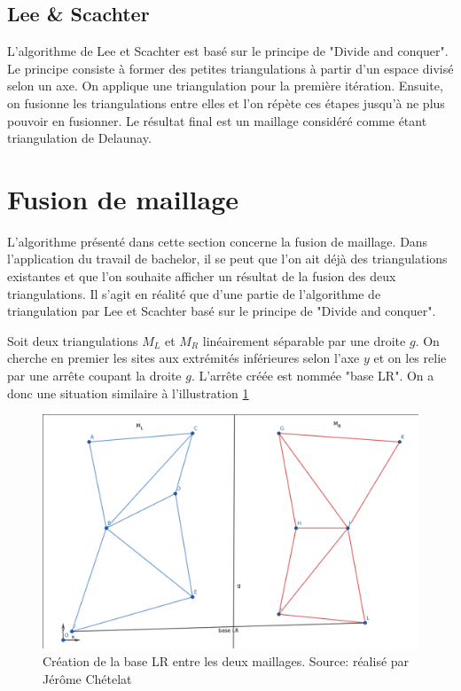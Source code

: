 \subsection{Lee \& Scachter}
L'algorithme de Lee et Scachter est basé sur le principe de "Divide and conquer". Le principe consiste à former des petites triangulations à partir d'un espace divisé selon un axe. On applique une triangulation pour la première itération. Ensuite, on fusionne les triangulations entre elles et l'on répète ces étapes jusqu'à ne plus pouvoir en fusionner. Le résultat final est un maillage considéré comme étant triangulation de Delaunay. 

\section{Fusion de maillage}

L'algorithme présenté dans cette section concerne la fusion de maillage. Dans l'application du travail de bachelor, il se peut que l'on ait déjà des triangulations existantes et que l'on souhaite afficher un résultat de la fusion des deux triangulations. Il s'agit en réalité que d'une partie de l'algorithme de triangulation par Lee et Scachter basé sur le principe de "Divide and conquer".



Soit deux triangulations $M_L$ et $M_R$ linéairement séparable par une droite $g$.
On cherche en premier les sites aux extrémités inférieures selon l'axe $y$ et on les relie par une arrête coupant la droite $g$.
L'arrête créée est nommée "base LR". On a donc une situation similaire à l'illustration \ref{fig:base_lr}

\begin{figure}[!htb]
    \centering
    \includegraphics[width=0.8\linewidth]{figures/base_lr.png}
    \caption{Création de la base LR entre les deux maillages. Source: réalisé par Jérôme Chételat}
    \label{fig:base_lr}
\end{figure}

